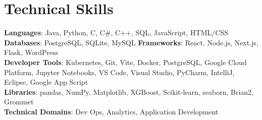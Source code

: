 \documentclass[letterpaper,11pt]{article}
\begin{document}
%
\section{Technical Skills}
 \begin{itemize}[leftmargin=0.15in, label={}]
    \small{\item{
     \textbf{Languages}{: Java, Python, C, C\#, C++, SQL, JavaScript, HTML/CSS} \\
     \textbf{Databases}{: PostgreSQL, SQLite, MySQL } 
     \textbf{Frameworks}{: React, Node.js, Next.js, Flask, WordPress} \\
     \textbf{Developer Tools}{: Kubernetes, Git, Vite, Docker, PostgreSQL, Google Cloud Platform, Jupyter Notebooks, VS Code, Visual Studio, PyCharm, IntelliJ, Eclipse, Google App Script} \\
     \textbf{Libraries}{: pandas, NumPy, Matplotlib, XGBoost, Scikit-learn, seaborn, Brian2, Grommet} \\
     \textbf{Technical Domains}{: Dev Ops, Analytics, Application Development} \\
    }}
 \end{itemize}


\end{document}
